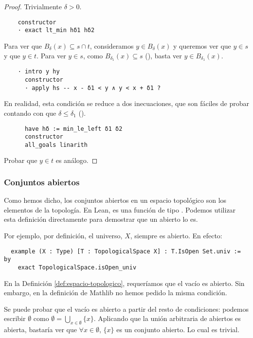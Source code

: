 \begin{proof}
  Trivialmente $\delta > 0$.
  
  \begin{lstlisting}
    constructor
    · exact lt_min hδ1 hδ2 \end{lstlisting}

  Para ver que $B_\delta (x) \subseteq s \cap t$, consideramos $y \in B_\delta(x)$ y queremos ver que $y \in s$ y que $y \in t$. Para ver $y \in s$, como $B_{\delta_1}(x) \subseteq s$ (), basta ver $y \in B_{\delta_1}(x)$.

  \begin{lstlisting}
    · intro y hy
      constructor
      · apply hs -- x - δ1 < y ∧ y < x + δ1 ? \end{lstlisting}

  En realidad, esta condición se reduce a dos inecuaciones, que son fáciles de probar contando con que $\delta \leq \delta_1$ ().

  \begin{lstlisting}
      have hδ := min_le_left δ1 δ2
      constructor
      all_goals linarith \end{lstlisting}

  Probar que $y \in t$ es análogo.
  
\end{proof}


\subsubsection{Conjuntos abiertos}

Como hemos dicho, los conjuntos abiertos en un espacio topológico son los elementos de la topología. En Lean, es una función  de tipo . Podemos utilizar esta definición directamente para demostrar que un abierto lo es.

\begin{example} 
    Por ejemplo, por definición, el universo, $X$, siempre es abierto. En efecto:
\end{example}

\begin{lstlisting}
  example (X : Type) [T : TopologicalSpace X] : T.IsOpen Set.univ := by
    exact TopologicalSpace.isOpen_univ \end{lstlisting}

\begin{example}
  En la Definición \ref{def:espacio-topologico}, requeríamos que el vacío es abierto. Sin embargo, en la definición de Mathlib no hemos pedido la misma condición.

  Se puede probar que el vacío es abierto a partir del resto de condiciones: podemos escribir $\emptyset$ como $\emptyset = \bigcup_{x \in \emptyset} \{x\}$. Aplicando que la unión arbitraria de abiertos es abierta, bastaría ver que $\forall x \in \emptyset$, $\{x\}$ es un conjunto abierto. Lo cual es trivial.
\end{example}


